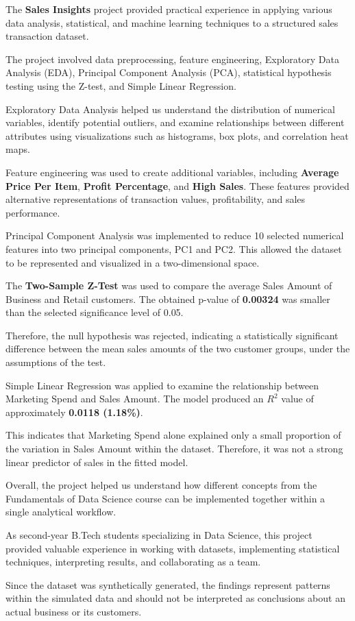 \documentclass[12pt,a4paper]{report}
\begin{document}
\begingroup
\fontsize{14}{21}\selectfont

The \textbf{Sales Insights} project provided
practical experience in applying various
data analysis, statistical, and machine
learning techniques to a structured
sales transaction dataset.

The project involved data preprocessing,
feature engineering, Exploratory Data
Analysis (EDA), Principal Component
Analysis (PCA), statistical hypothesis
testing using the Z-test, and
Simple Linear Regression.

Exploratory Data Analysis helped us
understand the distribution of numerical
variables, identify potential outliers,
and examine relationships between
different attributes using visualizations
such as histograms, box plots, and
correlation heat maps.

Feature engineering was used to create
additional variables, including
\textbf{Average Price Per Item},
\textbf{Profit Percentage}, and
\textbf{High Sales}. These features
provided alternative representations
of transaction values, profitability,
and sales performance.

Principal Component Analysis was
implemented to reduce 10 selected
numerical features into two principal
components, PC1 and PC2. This allowed
the dataset to be represented and
visualized in a two-dimensional space.

The \textbf{Two-Sample Z-Test} was used
to compare the average Sales Amount
of Business and Retail customers.
The obtained p-value of
\textbf{0.00324} was smaller than
the selected significance level
of 0.05.

Therefore, the null hypothesis
was rejected, indicating a
statistically significant difference
between the mean sales amounts
of the two customer groups,
under the assumptions of the test.

Simple Linear Regression was applied
to examine the relationship between
Marketing Spend and Sales Amount.
The model produced an
$R^2$ value of approximately
\textbf{0.0118 (1.18\%)}.

This indicates that Marketing Spend
alone explained only a small
proportion of the variation
in Sales Amount within the dataset.
Therefore, it was not a strong
linear predictor of sales
in the fitted model.

Overall, the project helped us
understand how different concepts
from the Fundamentals of Data Science
course can be implemented together
within a single analytical workflow.

As second-year B.Tech students
specializing in Data Science,
this project provided valuable
experience in working with datasets,
implementing statistical techniques,
interpreting results, and
collaborating as a team.

Since the dataset was synthetically
generated, the findings represent
patterns within the simulated data
and should not be interpreted
as conclusions about an actual
business or its customers.

\endgroup
\end{document}
